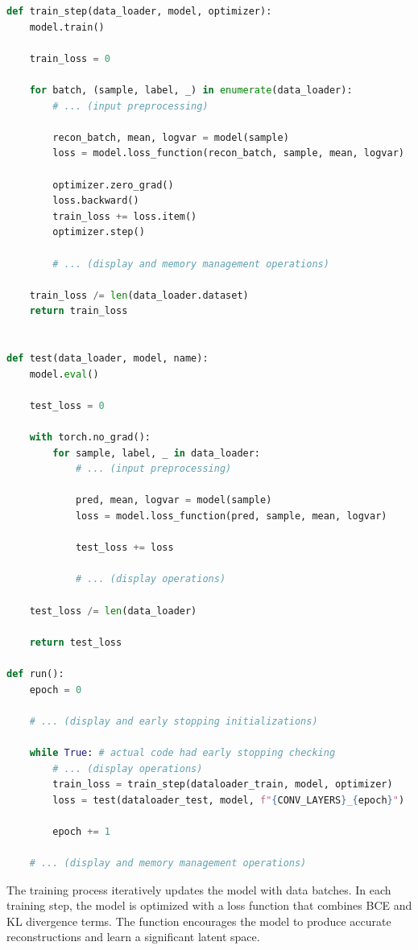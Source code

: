 \begin{lstlisting}[language=Python]
def train_step(data_loader, model, optimizer):
    model.train()

    train_loss = 0

    for batch, (sample, label, _) in enumerate(data_loader):
        # ... (input preprocessing)

        recon_batch, mean, logvar = model(sample)
        loss = model.loss_function(recon_batch, sample, mean, logvar)

        optimizer.zero_grad()
        loss.backward()
        train_loss += loss.item()
        optimizer.step()

        # ... (display and memory management operations)

    train_loss /= len(data_loader.dataset)
    return train_loss


def test(data_loader, model, name):
    model.eval()

    test_loss = 0

    with torch.no_grad():
        for sample, label, _ in data_loader:
            # ... (input preprocessing)

            pred, mean, logvar = model(sample)
            loss = model.loss_function(pred, sample, mean, logvar)

            test_loss += loss

            # ... (display operations)

    test_loss /= len(data_loader)

    return test_loss

def run():
    epoch = 0

    # ... (display and early stopping initializations)

    while True: # actual code had early stopping checking
        # ... (display operations)
        train_loss = train_step(dataloader_train, model, optimizer)
        loss = test(dataloader_test, model, f"{CONV_LAYERS}_{epoch}")

        epoch += 1

    # ... (display and memory management operations)
\end{lstlisting}

The training process iteratively updates the model with data batches. In each training step, the model is optimized with a loss function that combines \ac{BCE} and \ac{KL} divergence terms. The function encourages the model to produce accurate reconstructions and learn a significant latent space.

